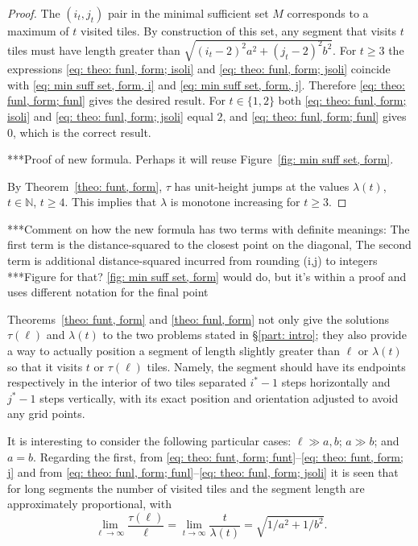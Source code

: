 \documentclass[12pt, a4paper]{article}
\newcommand{\funt}{\tau} %
\newcommand{\funl}{\lambda} %
\newcommand{\len}{\ell} %
\newcommand{\tiles}{t} %
\newcommand{\isoli}{i^\ast}
\newcommand{\jsoli}{j^\ast}
\newcommand{\mss}{M}
\begin{document}
\begin{proof}
The $(i_\tiles,j_\tiles)$ pair in the minimal sufficient set $\mss$ corresponds to a maximum of $\tiles$ visited tiles. By construction of this set, any segment that visits $\tiles$ tiles must have length greater than $\sqrt{(i_\tiles-2)^2a^2 + (j_\tiles-2)^2b^2}$. For $\tiles \geq 3$ the expressions \eqref{eq: theo: funl, form; isoli} and \eqref{eq: theo: funl, form; jsoli} coincide with \eqref{eq: min suff set, form, i} and \eqref{eq: min suff set, form, j}. Therefore \eqref{eq: theo: funl, form; funl} gives the desired result. For $\tiles \in \{1, 2\}$ both \eqref{eq: theo: funl, form; isoli} and \eqref{eq: theo: funl, form; jsoli} equal $2$, and \eqref{eq: theo: funl, form; funl} gives $0$, which is the correct result.

***Proof of new formula. Perhaps it will reuse Figure~\ref{fig: min suff set, form}.

By Theorem~\ref{theo: funt, form}, $\funt$ has unit-height jumps at the values $\funl(\tiles)$, $\tiles \in \mathbb N$, $\tiles \geq 4$. This implies that $\funl$ is monotone increasing for $\tiles \geq 3$.
\end{proof}

***Comment on how the new formula has two terms with definite meanings: The first term is the distance-squared to the closest point on the diagonal, The second term is additional distance-squared incurred from rounding (i,j) to integers
***Figure for that? \ref{fig: min suff set, form} would do, but it's within a proof and uses different notation for the final point

Theorems~\ref{theo: funt, form} and \ref{theo: funl, form} not only give the solutions $\funt(\len)$ and $\funl(\tiles)$ to the two problems stated in \S\ref{part: intro}; they also provide a way to actually position a segment of length slightly greater than $\len$ or $\funl(\tiles)$ so that it visits $\tiles$ or $\funt(\len)$ tiles. Namely, the segment should have its endpoints respectively in the interior of two tiles separated $\isoli-1$ steps horizontally and $\jsoli-1$ steps vertically, with its exact position and orientation  adjusted to avoid any grid points.

It is interesting to consider the following particular cases: $\len \gg a,b$; $a \gg b$; and $a=b$. Regarding the first, from \eqref{eq: theo: funt, form; funt}--\eqref{eq: theo: funt, form; j}
and from \eqref{eq: theo: funl, form; funl}--\eqref{eq: theo: funl, form; jsoli}
it is seen that for long segments the number of visited tiles and the segment length are approximately proportional, with
\begin{equation}
\label{eq: asympt}
\lim_{\len \rightarrow \infty} \frac{\funt(\len)}{\len}
= \lim_{\tiles \rightarrow \infty} \frac{\tiles}{\funl(\tiles)}
= \sqrt{1/a^2 + 1/b^2}.
\end{equation}
\end{document}
